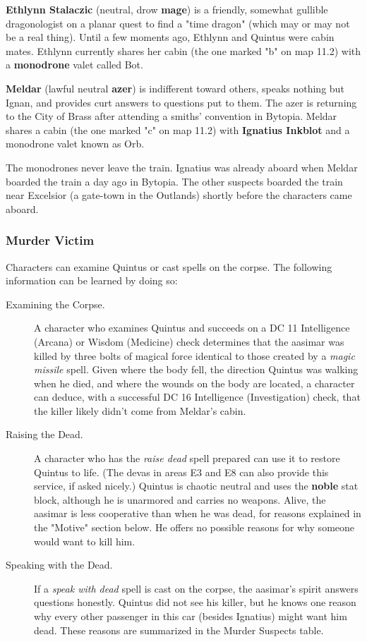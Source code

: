 \documentclass[10pt,a4paper,twoside,bg=print,twocolumn,openany,nodeprecatedcode]{dndbook}
\begin{document}
\textbf{Ethlynn Stalaczic} (neutral, drow \textbf{mage}) is a friendly, somewhat gullible dragonologist on a planar quest to find a "time dragon" (which may or may not be a real thing). Until a few moments ago, Ethlynn and Quintus were cabin mates. Ethlynn currently shares her cabin (the one marked "b" on map 11.2) with a \textbf{monodrone} valet called Bot.

\textbf{Meldar} (lawful neutral \textbf{azer}) is indifferent toward others, speaks nothing but Ignan, and provides curt answers to questions put to them. The azer is returning to the City of Brass after attending a smiths' convention in Bytopia. Meldar shares a cabin (the one marked "c" on map 11.2) with \textbf{Ignatius Inkblot} and a monodrone valet known as Orb.

The monodrones never leave the train. Ignatius was already aboard when Meldar boarded the train a day ago in Bytopia. The other suspects boarded the train near Excelsior (a gate-town in the Outlands) shortly before the characters came aboard.

\subsubsection{Murder Victim}
Characters can examine Quintus or cast spells on the corpse. The following information can be learned by doing so:


\begin{description}
\item[Examining the Corpse.]
A character who examines Quintus and succeeds on a DC 11 Intelligence (Arcana) or Wisdom (Medicine) check determines that the aasimar was killed by three bolts of magical force identical to those created by a \textit{magic missile} spell. Given where the body fell, the direction Quintus was walking when he died, and where the wounds on the body are located, a character can deduce, with a successful DC 16 Intelligence (Investigation) check, that the killer likely didn't come from Meldar's cabin.
\item[Raising the Dead.]
A character who has the \textit{raise dead} spell prepared can use it to restore Quintus to life. (The devas in areas E3 and E8 can also provide this service, if asked nicely.) Quintus is chaotic neutral and uses the \textbf{noble} stat block, although he is unarmored and carries no weapons. Alive, the aasimar is less cooperative than when he was dead, for reasons explained in the "Motive" section below. He offers no possible reasons for why someone would want to kill him.
\item[Speaking with the Dead.]
If a \textit{speak with dead} spell is cast on the corpse, the aasimar's spirit answers questions honestly. Quintus did not see his killer, but he knows one reason why every other passenger in this car (besides Ignatius) might want him dead. These reasons are summarized in the Murder Suspects table.
\end{description}
\end{document}
